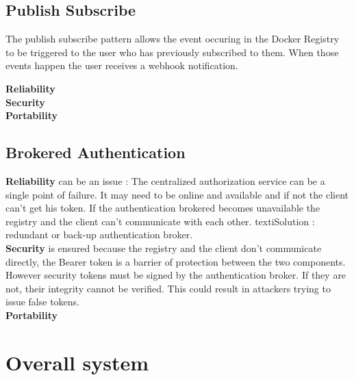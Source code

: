 \subsection{Publish Subscribe}

The publish subscribe pattern allows the event occuring in the Docker Registry to be triggered to the user who has previously subscribed to them. When those events happen the user receives a webhook notification.

\textbf{Reliability} \\
\textbf{Security} \\
\textbf{Portability} \\

\subsection{Brokered Authentication}
\textbf{Reliability} can be an issue :
The centralized authorization service can be a single point of failure. It may need to be online and available and if not the client can't get his token. If the authentication brokered becomes unavailable the registry and the client can't communicate with each other.
texti{Solution :} redundant or back-up authentication broker. \\
\textbf{Security} is ensured because the registry and the client don't communicate directly, the Bearer token is a barrier of protection between the two components.\\
However security tokens must be signed by the authentication broker. If they are not, their integrity cannot be verified. This could result in attackers trying to issue false tokens. \\
\textbf{Portability} \\


\section{Overall system}